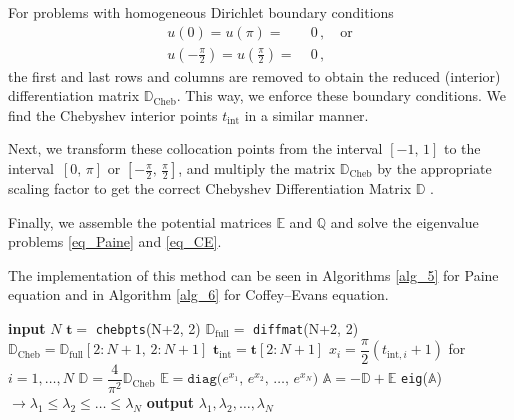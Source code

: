 \documentclass[11pt,a4paper,oneside,openright]{report} %
\begin{document}
For problems with homogeneous Dirichlet boundary conditions
\begin{subequations}
    \begin{align}
        u(0) = u(\pi) = & \; 0 \, , \quad \text{or} \\
        u\left(-\frac{\pi}{2}\right) = u\left(\frac{\pi}{2}\right) = & \; 0 \, ,
    \end{align}
\end{subequations}
the first and last rows and columns are removed to obtain the reduced (interior) differentiation matrix $\mathbb{D}_{\text{Cheb}}$. This way, we enforce these boundary conditions. We find the Chebyshev interior points $t_{\text{int}}$ in a similar manner.

Next, we transform these collocation points from the interval $[-1,  \, 1]$ to the interval~$[0,  \, \pi]$ or $[-\frac{\pi}{2},  \, \frac{\pi}{2}]$, and multiply the matrix $\mathbb{D}_{\text{Cheb}}$ by the appropriate scaling factor to get the correct Chebyshev Differentiation Matrix $\mathbb{D}$ \cite{cdm}\cite{trefethen}.

Finally, we assemble the potential matrices $\mathbb{E}$ and $\mathbb{Q}$ and solve the eigenvalue problems \eqref{eq_Paine} and \eqref{eq_CE}.

The implementation of this method can be seen in Algorithms \ref{alg_5} for Paine equation and in Algorithm \ref{alg_6} for Coffey--Evans equation.

\begin{algorithm}[H]
\caption{Chebyshev Differentiation Matrix - Paine equation}
\label{alg_5}
{\small
\begin{algorithmic}[1]
\State \textbf{input} $N$
\State $\boldsymbol{t} =$ \texttt{chebpts}(N+2, 2)
\State $\mathbb{D}_{\text{full}} =$ \texttt{diffmat}(N+2, 2)
\State $\mathbb{D}_{\text{Cheb}} = \mathbb{D}_{\text{full}}[2:N+1, \, 2:N+1]$
\State $\boldsymbol{t}_{\text{int}} = \boldsymbol{t}[2:N+1]$
\State $x_i = \dfrac{\pi}{2} (t_{\text{int},i} + 1)$ \quad for $i=1, \dots,N$
\State $\mathbb{D} = \dfrac{4}{\pi^2} \mathbb{D}_{\text{Cheb}}$
\State $\mathbb{E} = \texttt{diag}\big(e^{x_1},  \, e^{x_2},  \, \dots,  \, e^{x_N}\big)$
\State $\mathbb{A} = -\mathbb{D} + \mathbb{E}$
\BlankLine
\State \texttt{eig}($\mathbb{A}$) $ \to \lambda_1 \leq \lambda_2 \leq \dots \leq \lambda_N$
\State \textbf{output} $\lambda_1, \lambda_2, \dots, \lambda_N$
\end{algorithmic}
}
\end{algorithm}
\end{document}

